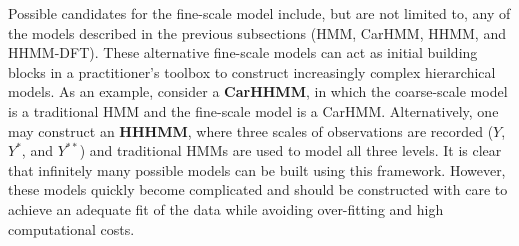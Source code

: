 Possible candidates for the fine-scale model include, but are not limited to, any of the models described in the previous subsections (HMM, CarHMM, HHMM, and HHMM-DFT). These alternative fine-scale models can act as initial building blocks in a practitioner's toolbox to construct increasingly complex hierarchical models. As an example, consider a \textbf{CarHHMM}, in which the coarse-scale model is a traditional HMM and the fine-scale model is a CarHMM. Alternatively, one may construct an \textbf{HHHMM}, where three scales of observations are recorded ($Y$, $Y^*$, and $Y^{**}$) and traditional HMMs are used to model all three levels. It is clear that infinitely many possible models can be built using this framework. However, these models quickly become complicated and should be constructed with care to achieve an adequate fit of the data while avoiding over-fitting and high computational costs.
